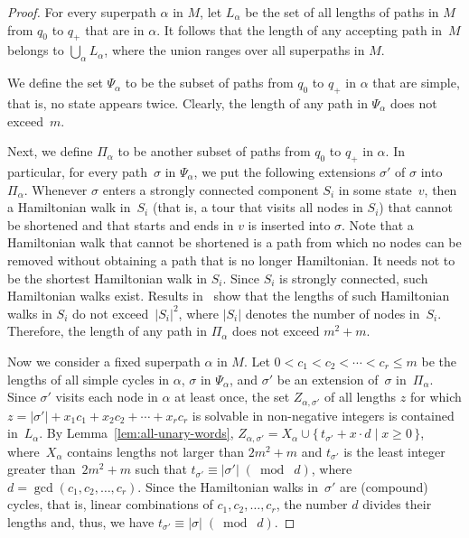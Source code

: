 \documentclass[final,copyright,noderivs]{eptcs}
\theoremstyle{plain}
\theoremstyle{definition}
\begin{document}
\begin{proof}
For every superpath $\alpha$ in $M$, let $L_\alpha$ be the set of all
lengths of paths in $M$ from $q_0$ to $q_+$ that are in $\alpha$. 
It follows that the length of any accepting path in~$M$ belongs to
$\bigcup_\alpha L_\alpha$, where the union 
ranges over all superpaths in $M$.

We define the set $\Psi_\alpha$ to be the subset of paths from $q_0$ to $q_+$ in
$\alpha$ that are simple, that is, no state appears twice. Clearly, the
length of any path in $\Psi_\alpha$ does not exceed~$m$.

Next, we define $\Pi_\alpha$ to be another subset of paths from $q_0$ to $q_+$ in
$\alpha$. In particular, for every path~$\sigma$ in $\Psi_\alpha$,
we put the following extensions $\sigma'$ of $\sigma$ into~$\Pi_\alpha$.
Whenever $\sigma$ enters a strongly connected component $S_i$ in some 
state~$v$, then a Hamiltonian walk in~$S_i$ (that is, a tour that
visits all nodes in $S_i$) that cannot be shortened and that starts and ends 
in $v$ is inserted into $\sigma$.
Note that a  Hamiltonian walk that cannot be shortened is a path from which no
nodes can be removed without obtaining a path that is no longer
Hamiltonian. It needs not to be the shortest Hamiltonian walk in $S_i$.
Since $S_i$ is strongly connected, such Hamiltonian walks exist.
Results in~\cite{hamidoune:1979:slphdlgo}
show that the lengths of such Hamiltonian walks in $S_i$ do not
exceed~$|S_i|^2$, 
where  $|S_i|$ denotes the number of nodes in~$S_i$.
Therefore, the length of any path in $\Pi_\alpha$ does not exceed
$m^2+m$.

Now we consider a fixed superpath $\alpha$ in $M$. 
Let \mbox{$0 < c_1 < c_2 < \cdots < c_r \leq m$} be the lengths of all 
simple cycles in $\alpha$, $\sigma$ in $\Psi_\alpha$, and
$\sigma'$ be an extension of~$\sigma$ in~$\Pi_\alpha$.
Since $\sigma'$ visits each node in $\alpha$ at least once, the set 
$Z_{\alpha,\sigma'}$ of all lengths $z$ for which
$z= |\sigma'| + x_1 c_1 + x_2 c_2 + \cdots + x_r c_r$ is solvable 
in non-negative integers is contained in~$L_\alpha$.
By Lemma~\ref{lem:all-unary-words},
\mbox{$Z_{\alpha,\sigma'} = X_\alpha \cup \{\, t_{\sigma'} + x\cdot d\mid x\geq 0\,\}$,} 
where~$X_\alpha$ contains lengths not larger than $2m^2+m$ and
$t_{\sigma'}$ is the least integer greater than~\mbox{$2m^2+m$} such that
$t_{\sigma'} \equiv |\sigma'|\; (\bmod\; d)$, where 
$d = \gcd(c_1,c_2,\dots, c_r)$. Since the Hamiltonian walks in~$\sigma'$
are (compound) cycles, that is, linear combinations of
$c_1, c_2, \dots, c_r$, the number $d$ divides their lengths and, thus,
we have \mbox{$t_{\sigma'} \equiv |\sigma|\; (\bmod\; d)$.}


\end{proof}
\end{document}

